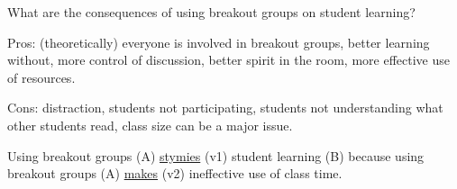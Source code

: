 \documentclass[12pt]{article}
\begin{document}
What are the consequences of using breakout groups on student learning?

Pros: (theoretically) everyone is involved in breakout groups, better learning without, more control of discussion, better spirit in the room, more effective use of resources.

Cons: distraction, students not participating, students not understanding what other students read, class size can be a major issue.

Using breakout groups (A) \uline{stymies} (v1) student learning (B) because using breakout groups (A) \uline{makes} (v2) ineffective use of class time.

\end{document}

